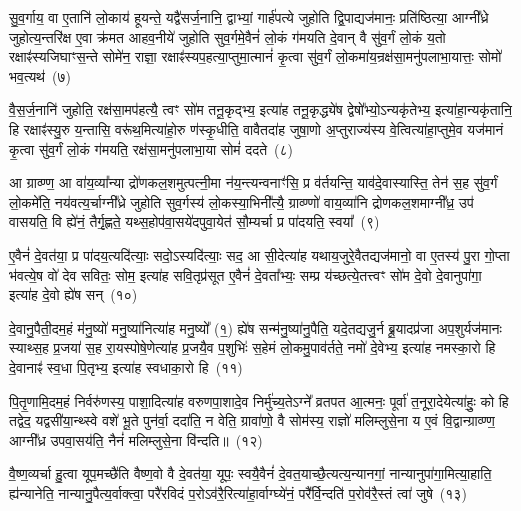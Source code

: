 {\anuvakamend[{स्तु॒ते वि॒न्दते॒ हि वी॑यन्ते प्र॒तीची॑रुद्गा॒त्र उ॒प्यन्ते॒ चतु॑र्दश च}]}

सु॒व॒र्गाय॒ वा ए॒तानि॑ लो॒काय॑ हूयन्ते॒ यद्वै॑सर्ज॒नानि॒ द्वाभ्यां॒ गार्\mbox{}ह॑पत्ये जुहोति द्वि॒पाद्यज॑मानः॒ प्रति॑ष्ठित्या॒ आग्नी᳚ध्रे जुहोत्य॒न्तरि॑क्ष ए॒वा क्र॑मत आहव॒नीये॑ जुहोति सुव॒र्गमे॒वैनं॑ लो॒कं ग॑मयति दे॒वान् वै सु॑व॒र्गं लो॒कं य॒तो रक्षाꣴ॑स्यजिघाꣳस॒न्ते सोमे॑न॒ राज्ञा॒ रक्षाꣴ॑स्यप॒हत्या॒प्तुमा॒त्मानं॑ कृ॒त्वा सु॑व॒र्गं लो॒कमा॑य॒न्रक्ष॑सा॒मनु॑पलाभा॒यात्तः॒ सोमो॑ भव॒त्यथ॑~(७)\ip

वै॒स॒र्ज॒नानि॑ जुहोति॒ रक्ष॑सा॒मप॑हत्यै॒ त्वꣳ सो॑म तनू॒कृद्भ्य॒ इत्या॑ह तनू॒कृद्ध्ये॑ष द्वेषो᳚भ्यो॒\-ऽन्यकृ॑तेभ्य॒ इत्या॑हा॒न्यकृ॑तानि॒ हि रक्षाꣴ॑स्यु॒रु य॒न्तासि॒ वरू॑थ॒मित्या॑हो॒रु ण॑स्कृ॒धीति॒ वावैतदा॑ह जुषा॒णो अ॒प्तुराज्य॑स्य वे॒त्वित्या॑हा॒प्तुमे॒व यज॑मानं कृ॒त्वा सु॑व॒र्गं लो॒कं ग॑मयति॒ रक्ष॑सा॒मनु॑पलाभा॒या सोमं॑ ददते~(८)\ip

आ ग्राव्ण्ण॒ आ वा॑य॒व्या᳚न्या द्रो॑णकल॒शमुत्पत्नी॒मा न॑य॒न्त्यन्वनाꣳ॑सि॒ प्र व॑र्तयन्ति॒ याव॑दे॒वास्यास्ति॒ तेन॑ स॒ह सु॑व॒र्गं लो॒कमे॑ति॒ नय॑वत्य॒र्चाग्नी᳚ध्रे जुहोति सुव॒र्गस्य॑ लो॒कस्या॒भिनी᳚त्यै॒ ग्राव्ण्णो॑ वाय॒व्या॑नि द्रोणकल॒शमाग्नी᳚ध्र॒ उप॑ वासयति॒ वि ह्ये॑नं॒ तैर्गृ॒ह्णते॒ यथ्स॒होप॑वा॒सये॑दपुवा॒येत॑ सौ॒म्यर्चा प्र पा॑दयति॒ स्वया᳚~(९)\ip

ए॒वैनं॑ दे॒वत॑या॒ प्र पा॑दय॒त्यदि॑त्याः॒ सदो॒\-ऽस्यदि॑त्याः॒ सद॒ आ सी॒देत्या॑ह यथाय॒जुरे॒वैतद्यज॑मानो॒ वा ए॒तस्य॑ पु॒रा गो॒प्ता भ॑वत्ये॒ष वो॑ देव सवितः॒ सोम॒ इत्या॑ह सवि॒तृप्र॑सूत ए॒वैनं॑ दे॒वता᳚भ्यः॒ सम्प्र य॑च्छत्ये॒तत्त्वꣳ सो॑म दे॒वो दे॒वानुपा॑गा॒ इत्या॑ह दे॒वो ह्ये॑ष सन्~(१०)\ip

दे॒वानु॒पैती॒दम॒हं म॑नु॒ष्यो॑ मनु॒ष्या॑नित्या॑ह मनु॒ष्यो᳚ (१॒) ह्ये॑ष सन्म॑नु॒ष्या॑नु॒पैति॒ यदे॒तद्यजु॒र्न ब्रू॒यादप्र॑जा अप॒शुर्यज॑मानः स्याथ्स॒ह प्र॒जया॑ स॒ह रा॒यस्पोषे॒णेत्या॑ह प्र॒जयै॒व प॒शुभिः॑ स॒हेमं लो॒कमु॒पाव॑र्तते॒ नमो॑ दे॒वेभ्य॒ इत्या॑ह नमस्का॒रो हि दे॒वानाꣴ॑ स्व॒धा पि॒तृभ्य॒ इत्या॑ह स्वधाका॒रो हि~(११)\ip

पि॒तृ॒णामि॒दम॒हं निर्वरु॑णस्य॒ पाशा॒दित्या॑ह वरुणपा॒शादे॒व निर्मु॑च्य॒ते\-ऽग्ने᳚ व्रतपत आ॒त्मनः॒ पूर्वा॑ त॒नूरा॒देयेत्या॑हुः॒ को हि तद्वेद॒ यद्वसी॑या॒न्थ्स्वे वशे॑ भू॒ते पुन॑र्वा॒ ददा॑ति॒ न वेति॒ ग्रावा॑णो॒ वै सोम॑स्य॒ राज्ञो॑ मलिम्लुसे॒ना य ए॒वं वि॒द्वान्ग्राव्ण्ण॒ आग्नी᳚ध्र उपवा॒सय॑ति॒ नैनं॑ मलिम्लुसे॒ना वि॑न्दति॥~(१२)\ip

{\anuvakamend[{अथ॑ ददते॒ स्वया॒ सन्थ्स्व॑धाका॒रो हि वि॑न्दति}]}

वै॒ष्ण॒व्यर्चा हु॒त्वा यूप॒मच्छै॑ति वैष्ण॒वो वै दे॒वत॑या॒ यूपः॒ स्वयै॒वैनं॑ दे॒वत॒याच्छै॒त्यत्य॒न्यानगां॒ नान्यानुपा॑गा॒मित्या॒हाति॒ ह्य॑न्यानेति॒ नान्यानु॒पैत्य॒र्वाक्त्वा॒ परै॑रविदं प॒रो\-ऽव॑रै॒रित्या॑हा॒र्वाग्घ्ये॑नं॒ परै᳚र्वि॒न्दति॑ प॒रोव॑रै॒स्तं त्वा॑ जुषे~(१३)\ip

